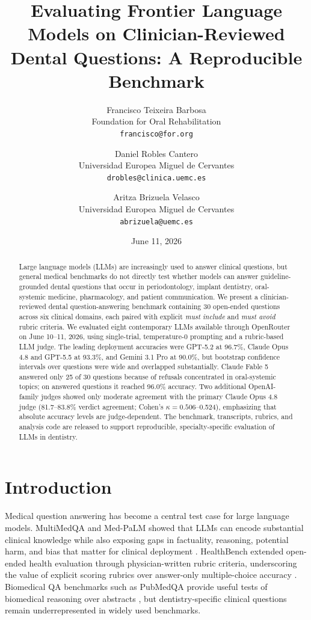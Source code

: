 \documentclass[11pt]{article}
\title{Evaluating Frontier Language Models on Clinician-Reviewed Dental Questions: A Reproducible Benchmark}
\author{
Francisco Teixeira Barbosa\\
Foundation for Oral Rehabilitation\\
\texttt{francisco@for.org}
\and
Daniel Robles Cantero\\
Universidad Europea Miguel de Cervantes\\
\texttt{drobles@clinica.uemc.es}
\and
Aritza Brizuela Velasco\\
Universidad Europea Miguel de Cervantes\\
\texttt{abrizuela@uemc.es}
}
\date{June 11, 2026}
\begin{document}
\maketitle

\begin{abstract}
Large language models (LLMs) are increasingly used to answer clinical questions, but general medical benchmarks do not directly test whether models can answer guideline-grounded dental questions that occur in periodontology, implant dentistry, oral-systemic medicine, pharmacology, and patient communication.
We present a clinician-reviewed dental question-answering benchmark containing 30 open-ended questions across six clinical domains, each paired with explicit \emph{must include} and \emph{must avoid} rubric criteria.
We evaluated eight contemporary LLMs available through OpenRouter on June 10--11, 2026, using single-trial, temperature-0 prompting and a rubric-based LLM judge.
The leading deployment accuracies were GPT-5.2 at 96.7\%, Claude Opus 4.8 and GPT-5.5 at 93.3\%, and Gemini 3.1 Pro at 90.0\%, but bootstrap confidence intervals over questions were wide and overlapped substantially.
Claude Fable 5 answered only 25 of 30 questions because of refusals concentrated in oral-systemic topics; on answered questions it reached 96.0\% accuracy.
Two additional OpenAI-family judges showed only moderate agreement with the primary Claude Opus 4.8 judge (81.7--83.8\% verdict agreement; Cohen's $\kappa=0.506$--0.524), emphasizing that absolute accuracy levels are judge-dependent.
The benchmark, transcripts, rubrics, and analysis code are released to support reproducible, specialty-specific evaluation of LLMs in dentistry.
\end{abstract}

\section{Introduction}

Medical question answering has become a central test case for large language models.
MultiMedQA and Med-PaLM showed that LLMs can encode substantial clinical knowledge while also exposing gaps in factuality, reasoning, potential harm, and bias that matter for clinical deployment \cite{singhal2023clinical}.
HealthBench extended open-ended health evaluation through physician-written rubric criteria, underscoring the value of explicit scoring rubrics over answer-only multiple-choice accuracy \cite{arora2025healthbench}.
Biomedical QA benchmarks such as PubMedQA provide useful tests of biomedical reasoning over abstracts \cite{jin2019pubmedqa}, but dentistry-specific clinical questions remain underrepresented in widely used benchmarks.
\end{document}
